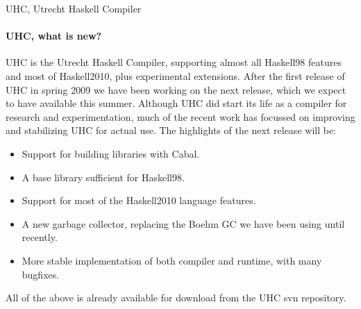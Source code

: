 \begin{hcarentry}{UHC, Utrecht Haskell Compiler}
\label{uhc}
\label{ehc}
\makeheader

\paragraph{UHC, what is new?}
UHC is the Utrecht Haskell Compiler, supporting almost all Haskell98 features and most of Haskell2010, plus
experimental extensions.
After the first release of UHC in spring 2009 we have been working on the next release, which we expect to have available this summer.
Although UHC did start its life as a compiler for research and experimentation,
much of the recent work has focussed on improving and stabilizing UHC for actual use.
The highlights of the next release will be:
\begin{itemize}
\item Support for building libraries with Cabal.
\item A base library sufficient for Haskell98.
\item Support for most of the Haskell2010 language features.
\item A new garbage collector, replacing the Boehm GC we have been using until recently.
\item More stable implementation of both compiler and runtime, with many bugfixes.
\end{itemize}
All of the above is already available for download from the UHC svn repository.


\end{hcarentry}
